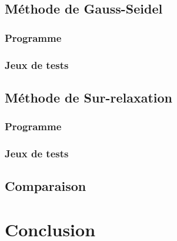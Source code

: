 \documentclass{report}
\begin{document}
  	\section{Méthode de Gauss-Seidel}
  	  \subsection{Programme}
      \newpage
      \subsection{Jeux de tests}
  	\newpage
  	\section{Méthode de Sur-relaxation}
  	  \subsection{Programme}
        
      \newpage
      \subsection{Jeux de tests}
     \newpage
     \section{Comparaison}
  \chapter*{Conclusion}
  
\end{document}
